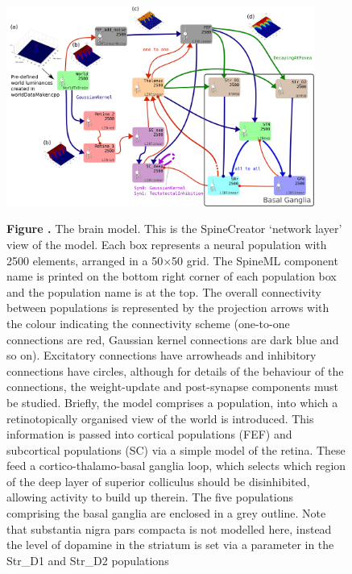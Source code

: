 \documentclass{frontiersSCNS}
\begin{document}
\begin{figure}[htb!]
\begin{center}
\includegraphics[width=0.9\textwidth]{./figures/Brain_Model.png}
\end{center}
\textbf{\label{brain_model} Figure .}
{ The brain model. This is the SpineCreator
`network layer' view of the model. Each box represents a neural
population with 2500 elements, arranged in a 50$\times$50 grid. The
SpineML component name is printed on the bottom right corner of each
population box and the population name is at the top. The overall
connectivity between populations is represented by the projection
arrows with the colour indicating the connectivity scheme (one-to-one
connections are red, Gaussian kernel connections are dark blue and so
on). Excitatory connections have arrowheads and inhibitory connections
have circles, although for details of the behaviour of the
connections, the weight-update and post-synapse components must be
studied. Briefly, the model comprises a  population, into
which a retinotopically organised view of the world is
introduced. This information is passed into cortical populations (FEF)
and subcortical populations (SC) via a simple model of the
retina. These feed a cortico-thalamo-basal ganglia loop, which selects
which region of the deep layer of superior colliculus should be
disinhibited, allowing activity to build up therein. The five
populations comprising the basal ganglia are enclosed in a grey
outline. Note that substantia nigra pars compacta is not modelled
here, instead the level of dopamine in the striatum is set via a
parameter in the Str\_D1 and Str\_D2 populations}
\end{figure}
\end{document}
